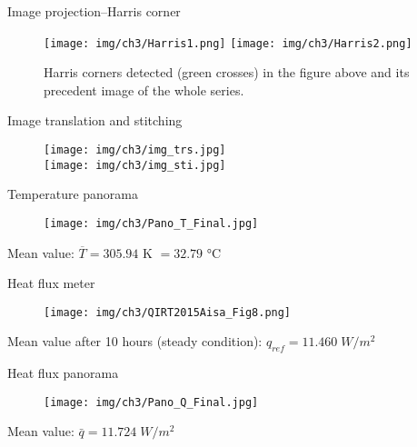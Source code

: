 \begin{frame}{Image projection--\small{Harris corner}}
    \begin{figure}
        \hspace*{-15pt}
        \texttt{[image: img/ch3/Harris1.png]}
        \texttt{[image: img/ch3/Harris2.png]}
        \caption{Harris corners detected (green crosses) in the figure above and its precedent image of the whole series. }
    \end{figure}
\end{frame}


\begin{frame}{Image translation and stitching}
    \begin{figure}
        \centering
        \vspace*{-10pt}
        \texttt{[image: img/ch3/img\_trs.jpg]}\\
        \pause
        \texttt{[image: img/ch3/img\_sti.jpg]}
    \end{figure}
\end{frame}


\begin{frame}{Temperature panorama}
    \begin{figure}
        \hspace*{-15pt}
        \texttt{[image: img/ch3/Pano\_T\_Final.jpg]}
    \end{figure}
    \centering
    Mean value: $ \overline{T} = 305.94$ K $= 32.79$ °C
\end{frame}

\begin{frame}{Heat flux meter}
    \begin{figure}
    \centering
    \vspace*{-18pt}
    \texttt{[image: img/ch3/QIRT2015Aisa\_Fig8.png]}
    \end{figure}
    Mean value after 10 hours (steady condition): $q_{ref}=11.460\; W/m^2$
\end{frame}

\begin{frame}{Heat flux panorama}
    \begin{figure}
        \hspace*{-15pt}
        \texttt{[image: img/ch3/Pano\_Q\_Final.jpg]}
    \end{figure}
    \centering
    Mean value: $\bar{q}=11.724\; W/m^2$
\end{frame}


